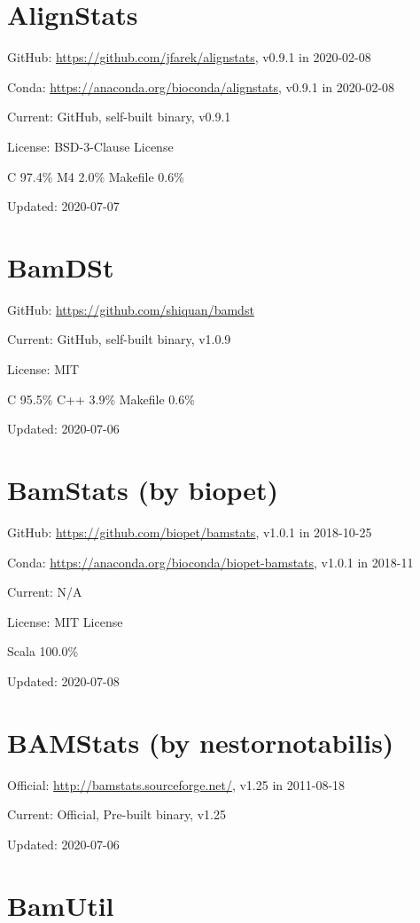 \documentclass[]{article}
\begin{document}
\section{AlignStats}

GitHub: \url{https://github.com/jfarek/alignstats}, v0.9.1 in 2020-02-08

Conda: \url{https://anaconda.org/bioconda/alignstats}, v0.9.1 in 2020-02-08

Current: GitHub, self-built binary, v0.9.1

License: BSD-3-Clause License

C 97.4\% M4 2.0\% Makefile 0.6\%

Updated: 2020-07-07

\section{BamDSt}

GitHub: \url{https://github.com/shiquan/bamdst}

Current: GitHub, self-built binary, v1.0.9

License: MIT

C 95.5\% C++ 3.9\% Makefile 0.6\%

Updated: 2020-07-06

\section{BamStats (by biopet)}

GitHub: \url{https://github.com/biopet/bamstats}, v1.0.1 in 2018-10-25

Conda: \url{https://anaconda.org/bioconda/biopet-bamstats}, v1.0.1 in 2018-11

Current: N/A

License: MIT License

Scala 100.0\%

Updated: 2020-07-08

\section{BAMStats (by nestornotabilis)}

Official: \url{http://bamstats.sourceforge.net/}, v1.25 in 2011-08-18

Current: Official, Pre-built binary, v1.25

Updated: 2020-07-06


\section{BamUtil}
\end{document}
